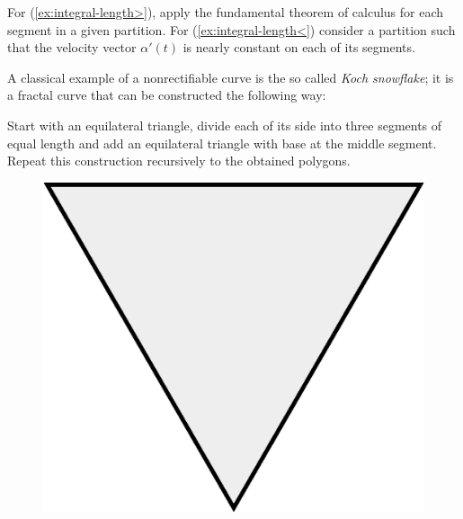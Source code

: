  For (\ref{ex:integral-length>}), apply the fundamental theorem of calculus for each segment in a given partition. For (\ref{ex:integral-length<}) consider a partition such that the velocity vector $\alpha'(t)$ is nearly constant on each of its segments.


A classical example of a nonrectifiable curve is the so called \emph{Koch snowflake};
it is a fractal curve that can be constructed the following way:

Start with an equilateral triangle, divide each of its side into three segments of equal length and add an equilateral triangle with base at the middle segment.
Repeat this construction recursively to the obtained polygons.
\begin{figure}[h!]
\begin{minipage}{.24\textwidth}
\centering
\vskip5.9mm
\includegraphics[scale=.15]{pics/Koch_Snowflake-0}
\end{minipage}
\hfill
\begin{minipage}{.24\textwidth}
\centering

\end{minipage}
\end{figure}
